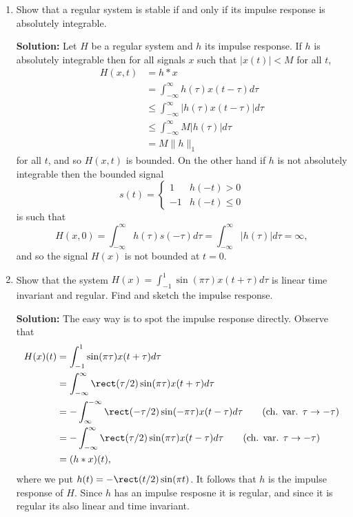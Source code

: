 \documentclass[11pt,a4paper]{book}
\theoremstyle{plain}
\numberwithin{equation}{section}
\newcommand{\abs}[1]{\left\vert #1 \right\vert}
\newcommand{\sabs}[1]{\vert #1 \vert}
\newenvironment{solution}{\begin{footnotesize}\textbf{Solution:}}{\end{footnotesize}}
\newenvironment{excersizelist}{%
  \renewcommand*{\theenumi}{\thechapter.\arabic{enumi}}%
  \newcommand\itemadvanced{\stepcounter{enumi}\item[$\ast$\, \theenumi.]}
  \begin{enumerate}
}{%
  \end{enumerate}
}
\begin{document}
\begin{excersizelist}
\item \label{excer:bibostableimpulseresp} Show that a regular system is stable if and only if its impulse response is absolutely integrable.
\begin{solution}
Let $H$ be a regular system and $h$ its impulse response.  If $h$ is absolutely integrable then for all signals $x$ such that $\sabs{x(t)} < M$ for all $t$,
\begin{align*}
H(x,t) &= h * x \\
&= \int_{-\infty}^\infty h(\tau)  x(t - \tau) d\tau \\
&\leq \int_{-\infty}^\infty \sabs{h(\tau) x(t - \tau)} d\tau \\
&\leq \int_{-\infty}^\infty M \sabs{h(\tau)} d\tau \\
&= M \|h\|_1
\end{align*}
for all $t$, and so $H(x,t)$ is bounded.  On the other hand if $h$ is not absolutely integrable then the bounded signal 
\[
s(t) = \begin{cases}
1 & h(-t) > 0 \\
-1 & h(-t) \leq 0
\end{cases}
\]
is such that
\[
H(x,0) = \int_{-\infty}^\infty h(\tau)  s(-\tau) d\tau = \int_{-\infty}^\infty \abs{h(\tau)} d\tau = \infty,
\]
and so the signal $H(x)$ is not bounded at $t = 0$.
\end{solution}

\item Show that the system $H(x) = \int_{-1}^{1} \sin(\pi\tau) x(t + \tau) d\tau$ is linear time invariant and regular.  Find and sketch the impulse response.
\begin{solution}
The easy way is to spot the impulse response directly.  Observe that
\begin{align*}
H(x)(t) &= \int_{-1}^{1} \sin(\pi\tau) x(t + \tau) d\tau \\
&= \int_{-\infty}^\infty \rect(\tau/2) \sin(\pi\tau) x(t + \tau) d\tau\\
&= -\int_{\infty}^{-\infty} \rect(-\tau/2) \sin(-\pi\tau) x(t - \tau) d\tau \qquad \text{(ch. var. $\tau \to -\tau$)} \\
&= -\int_{-\infty}^{\infty} \rect(\tau/2) \sin(\pi\tau) x(t - \tau) d\tau \qquad \text{(ch. var. $\tau \to -\tau$)} \\
&= (h * x)(t),
\end{align*}
where we put $h(t) = -\rect(t/2) \sin(\pi t)$.  It follows that $h$ is the impulse response of $H$.  Since $h$ has an impulse resposne it is regular, and since it is regular its also linear and time invariant.


\end{solution}
\end{excersizelist}
\end{document}

